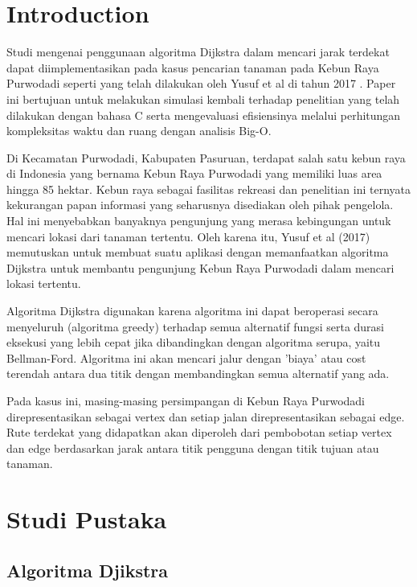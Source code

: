 \documentclass[conference]{IEEEtran}
\begin{document}
\section{Introduction}
    Studi mengenai penggunaan algoritma Dijkstra dalam mencari jarak terdekat dapat diimplementasikan pada kasus pencarian tanaman pada Kebun Raya Purwodadi seperti yang telah
    dilakukan oleh Yusuf et al di tahun 2017 \cite{yusuf2017implementasi}. Paper ini bertujuan untuk melakukan simulasi kembali terhadap penelitian
    yang telah dilakukan dengan bahasa C serta mengevaluasi
    efisiensinya melalui perhitungan kompleksitas waktu dan ruang dengan analisis Big-O.
    
    Di Kecamatan Purwodadi, Kabupaten Pasuruan, terdapat
    salah satu kebun raya di Indonesia yang bernama Kebun
    Raya Purwodadi yang memiliki luas area hingga 85 hektar.
    Kebun raya sebagai fasilitas rekreasi dan penelitian ini ternyata
    kekurangan papan informasi yang seharusnya disediakan oleh
    pihak pengelola. Hal ini menyebabkan banyaknya pengunjung
    yang merasa kebingungan untuk mencari lokasi dari tanaman
    tertentu. Oleh karena itu, Yusuf et al (2017) memutuskan
    untuk membuat suatu aplikasi dengan memanfaatkan algoritma
    Dijkstra untuk membantu pengunjung Kebun Raya Purwodadi
    dalam mencari lokasi tertentu.
    
    Algoritma Dijkstra digunakan karena algoritma ini dapat
    beroperasi secara menyeluruh (algoritma greedy) terhadap
    semua alternatif fungsi serta durasi eksekusi yang lebih cepat
    jika dibandingkan dengan algoritma serupa, yaitu Bellman-Ford. Algoritma ini akan mencari jalur dengan 'biaya' atau cost terendah antara dua titik dengan membandingkan semua
    alternatif yang ada.
    
    Pada kasus ini, masing-masing persimpangan di Kebun
    Raya Purwodadi direpresentasikan sebagai vertex dan setiap
    jalan direpresentasikan sebagai edge. Rute terdekat yang didapatkan akan diperoleh dari pembobotan setiap vertex dan edge
    berdasarkan jarak antara titik pengguna dengan titik tujuan
    atau tanaman.

\section{Studi Pustaka}

\subsection{Algoritma Djikstra}
\end{document}
